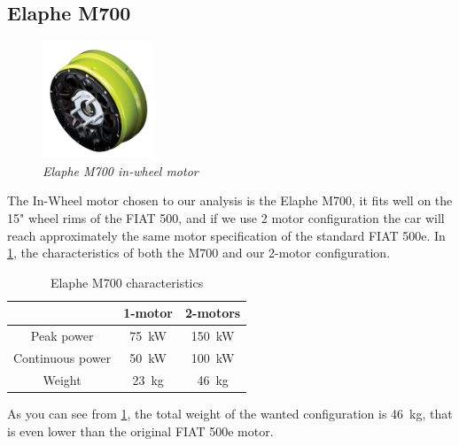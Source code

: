 \documentclass{article}
\numberwithin{equation}{section}
\numberwithin{figure}{section}
\numberwithin{table}{section}
\numberwithin{table}{section}
\begin{document}
\subsection{Elaphe M700}
\begin{figure}[H]
    \centering
    \includegraphics[width=0.3\textwidth]{Pictures/M700.png}
    \caption{\emph{Elaphe M700 in-wheel motor}}
    \label{fig:m700_motor}
\end{figure}
The In-Wheel motor chosen to our analysis is the Elaphe M700\cite{elapheM700_page}, it fits well on the 15" wheel rims of the FIAT 500, and if we use 2 motor configuration the car will reach approximately the same motor specification of the standard FIAT 500e.
In \cref{tab:m700_characteristics}, the characteristics of both the M700 and our 2-motor configuration.
\begin{table}[H]
    \centering
    \begin{tabular}{|c|c|c|}
        \hline
        & \textbf{1-motor}&\textbf{2-motors}\\
        \hline
        \hline
        Peak power& \SI{75}{\kilo\watt}&\SI{150}{\kilo\watt}\\
        \hline
        Continuous power& \SI{50}{\kilo\watt}&\SI{100}{\kilo\watt}\\
        \hline
        Weight& \SI{23}{\kilo\gram}&\SI{46}{\kilo\gram}\\
        \hline
    \end{tabular}
    \caption{Elaphe M700 characteristics}
    \label{tab:m700_characteristics}
\end{table}
As you can see from \cref{tab:m700_characteristics}, the total weight of the wanted configuration is \SI{46}{\kilo\gram}, that is even lower than the original FIAT 500e motor.
\end{document}
